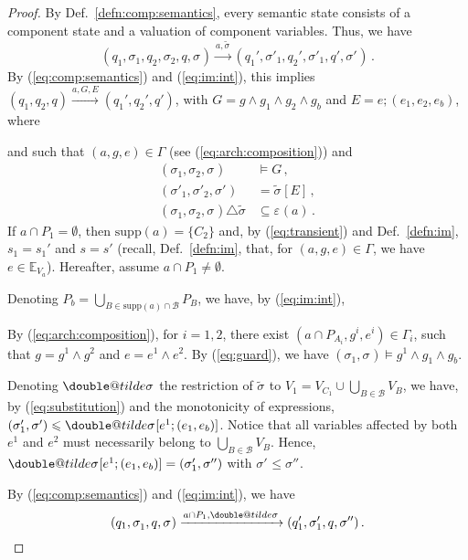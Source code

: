 \documentclass{llncs}
\makeatletter
\newcommand{\defn}[1]{Def.~\ref{defn:#1}}
\newcommand{\eq}[1]{(\ref{eq:#1})}
\newcommand{\cB}{\ensuremath{\mathcal{B}}}
\newcommand{\sE}{\ensuremath{\mathbb{E}}}
\newcommand{\goesto}[2][]{\ensuremath{\xrightarrow[#1]{#2}}}
\newcommand{\exprs}[1]{\ensuremath{\sE_{#1}}}
\newcommand{\val}[3][]{\ensuremath{#1{\sigma}^{#2}_{#3}}}
\newcommand{\primeit}[1]{#1'}
\newcommand{\doubleprimeit}[1]{#1''}
\newcommand{\export}[1][]{\ensuremath{\varepsilon_{#1}}}
\newcommand{\valdiff}[2]{\ensuremath{#1 \triangle #2}}
\newcommand{\supp}[1]{\ensuremath{\mathrm{supp}(#1)}}
\newcommand{\order}{\leqslant}
\newcommand{\doubletilde}[1]{{%
  \mathpalette\double@tilde{#1}%
}}
\newcommand{\double@tilde}[2]{%
  \sbox\z@{$\m@th#1\tilde{#2}$}%
  \ht\z@=.9\ht\z@
  \tilde{\box\z@}%
}
\makeatother
\begin{document}
\begin{proof}
  By \defn{comp:semantics}, every semantic state consists of a
  component state and a valuation of component variables.  Thus,
  we have
%
  \[
  (q_1, \val{}{1}, q_2, \val{}{2}, q, \val{}{})
%
  \goesto{a, \tilde{\val{}{}}}
%
  (q_1', \val[\primeit]{}{1}, q_2', \val[\primeit]{}{1}, q', \val[\primeit]{}{})
  \,.
  \]
%
  By \eq{comp:semantics} and \eq{im:int}, this implies
  $(q_1, q_2, q) \goesto {a, G, E} (q_1', q_2', q')$, with
%
  $G = g \land g_1 \land g_2 \land g_b$
  and
  $E = e; (e_1, e_2, e_b)$,
  where
%    
%
  and such that $(a, g, e) \in \Gamma$ (see
  \eq{arch:composition}) and
%
  \begin{align}
    \label{eq:guard}
    (\val{}{1}, \val{}{2}, \val{}{}) &\models G
    \,,
    \\
    \label{eq:substitution}
    (\val[\primeit]{}{1}, \val[\primeit]{}{2}, \val[\primeit]{}{})
    &= \val[\tilde]{}{}[E]
    \,,
    \\
    \label{eq:transient}
    \valdiff{(\val{}{1}, \val{}{2}, \val{}{})}{\val[\tilde]{}{}}
    &\subseteq \export(a)
    \,.
  \end{align}
%
  If $a \cap P_1 = \emptyset$, then $\supp{a} = \{C_2\}$ and, by
  \eq{transient} and \defn{im}, $s_1 = s_1'$ and $s = s'$
  (recall, \defn{im}, that, for $(a,g,e) \in \Gamma$, we have $e
  \in \exprs{V_a}$).  Hereafter, assume $a \cap P_1 \neq
  \emptyset$.

  Denoting $P_b = \bigcup_{B \in \supp{a} \cap \cB} P_B$, we
  have, by \eq{im:int},
%
 
  By \eq{arch:composition}, for $i=1,2$, there exist
  $(a \cap P_{A_i}, g^i, e^i) \in \Gamma_i$,
  such that $g = g^1 \land g^2$ and $e = e^1 \land e^2$.
  By \eq{guard}, we have
  $(\val{}{1}, \val{}{}) \models g^1 \land g_1 \land g_b$.

  Denoting $\val[\doubletilde]{}{}$ the restriction of
%
  $\val[\tilde]{}{}$ to
  $V_1 = V_{C_1} \cup \bigcup_{B \in \cB} V_B$,
%
  we have, by \eq{substitution} and the monotonicity of
  expressions,
%
  $(\val[\primeit]{}{1}, \val[\primeit]{}{}) \order
  \val[\doubletilde]{}{}[e^1; (e_1, e_b)]$.  Notice that all
  variables affected by both $e^1$ and $e^2$ must necessarily
  belong to $\bigcup_{B \in \cB} V_B$.  Hence,
%
  $\val[\doubletilde]{}{}[e^1; (e_1, e_b)] =
  (\val[\primeit]{}{1}, \val[\doubleprimeit]{}{})$ with 
  $\val[\primeit]{}{} \order \val[\doubleprimeit]{}{}$.

  By \eq{comp:semantics} and \eq{im:int}, we have
  \[
  (q_1, \val{}{1}, q, \val{}{})
  \goesto{a \cap P_1, \val[\doubletilde]{}{}}
  (q_1', \val[\primeit]{}{1}, q, \val[\doubleprimeit]{}{})
  \,.
  \]
\end{proof}
\end{document}
